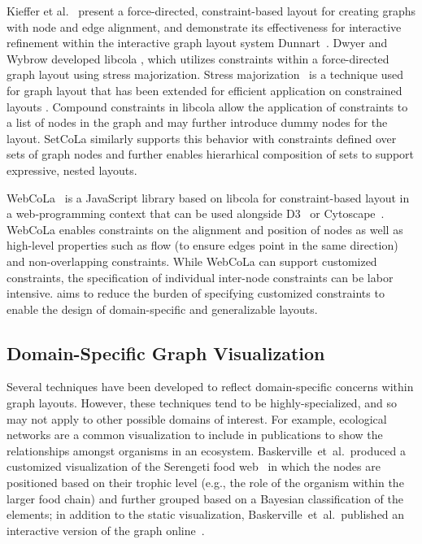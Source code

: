 Kieffer et al.~\cite{kieffer2013incremental} present a force-directed,
constraint-based layout for creating graphs with node and edge alignment, 
and demonstrate its effectiveness for interactive refinement within
the interactive graph layout system Dunnart~\cite{dwyer2008dunnart}.
Dwyer and Wybrow developed libcola \cite{libcola}, which utilizes constraints within a
force-directed graph layout \cite{dwyer2008topology} using 
stress majorization. Stress majorization~\cite{gansner2004graph} 
is a technique used for graph layout that has been extended for efficient 
application on constrained layouts \cite{dwyer2007constrained,wang2018revisiting}.
Compound constraints in libcola allow the application of constraints to a list
of nodes in the graph and may further introduce dummy nodes for the layout.
SetCoLa similarly supports this behavior with constraints defined over sets
of graph nodes and further enables hierarhical composition of sets to support
expressive, nested layouts.

WebCoLa~\cite{WebCoLa} is a JavaScript library based on libcola 
for constraint-based layout in a web-programming context that can be used alongside
D3~\cite{bostock:d3} or Cytoscape~\cite{shannon2003cytoscape}.
WebCoLa enables constraints on the alignment and
position of nodes as well as high-level properties such as flow (to ensure
edges point in the same direction) and non-overlapping constraints.
While WebCoLa can support customized constraints,
the specification of individual inter-node constraints can be labor intensive.
\projectname aims to reduce the burden of specifying customized constraints
to enable the design of domain-specific and generalizable layouts.

\vspace{-5px}
\subsection{Domain-Specific Graph Visualization}
Several techniques have been developed to reflect domain-specific concerns
within graph layouts. However, these techniques
tend to be highly-specialized, and so may not apply to other possible
domains of interest. For example, ecological networks are a common visualization
to include in publications to show the relationships amongst organisms in
an ecosystem. Baskerville~et~al.\ produced a customized visualization of 
the Serengeti food web~\cite{baskerville2011spatial} in which the nodes
are positioned based on their trophic level (e.g., the role of the
organism within the larger food chain) and further grouped based on a
Bayesian classification of the elements;  in addition to the 
static visualization, Baskerville~et~al.\ 
published an interactive version of the graph online~\cite{baskerville2011interactive}. 

